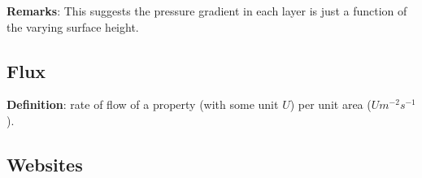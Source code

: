 {\bf Remarks}: This suggests the pressure gradient in each layer is just a function of the varying surface height.


\subsection{Flux}
{\bf Definition}: rate of flow of a property (with some unit $U$) per unit area ($U m^{-2}s^{-1}$).

%
\subsection{Websites}

